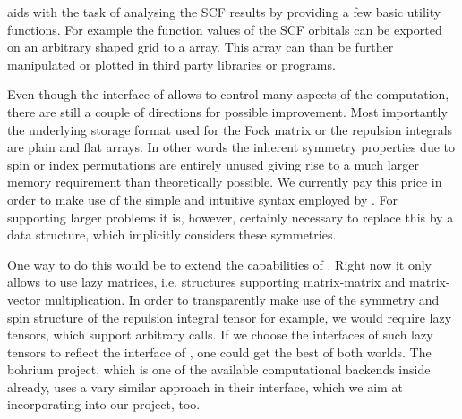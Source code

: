 \molsturm aids with the task of analysing the SCF results
by providing a few basic utility functions.
For example the function values of the SCF orbitals can be exported on an
arbitrary shaped grid to a \numpy array.
This array can than be further manipulated or
plotted in third party libraries or programs.


Even though the \python interface of \molsturm allows to control many
aspects of the computation,
there are still a couple of directions for possible improvement.
Most importantly the underlying storage format used
for the Fock matrix or the repulsion integrals are plain and flat \numpy arrays.
In other words the inherent symmetry properties due to spin or index permutations
are entirely unused
giving rise to a much larger memory requirement than theoretically possible.
We currently pay this price in order to make use of the simple and intuitive
syntax employed by \numpy.
For supporting larger problems it is,
however, certainly necessary to replace this by a data structure,
which implicitly considers these symmetries.

One way to do this would be to extend the capabilities of \lazyten.
Right now it only allows to use lazy matrices,
i.e. structures supporting matrix-matrix and matrix-vector
multiplication.
In order to transparently make use of the symmetry and spin structure
of the repulsion integral tensor for example,
we would require lazy tensors,
which support arbitrary \contraction calls.
If we choose the interfaces of such lazy tensors to reflect
the interface of \numpy,
one could get the best of both worlds.
The bohrium project,
which is one of the available computational backends inside \lazyten already,
uses a vary similar approach in their interface,
which we aim at incorporating into our project, too.

